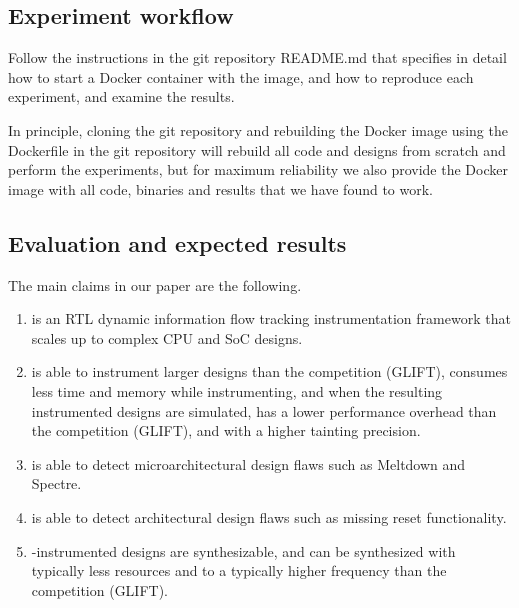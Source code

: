 \documentclass[letterpaper,twocolumn,10pt]{article}
\begin{document}
{%
\subsection{Experiment workflow}

Follow the instructions in the git repository README.md that specifies
in detail how to start a Docker container with the image, and how to
reproduce each experiment, and examine the results.

In principle, cloning the git repository and rebuilding the Docker image
using the Dockerfile in the git repository will rebuild all \ourname code
and designs from scratch and perform the experiments, but for maximum
reliability we also provide the Docker image with all code, binaries
and results that we have found to work.

\subsection{Evaluation and expected results}


The main claims in our paper are the following.

\begin{enumerate}
    \item \ourname is an RTL dynamic information flow tracking instrumentation framework that scales up to complex CPU and SoC designs.
    \item \ourname is able to instrument larger designs than the competition (GLIFT), consumes less time and memory while instrumenting, and when the resulting instrumented designs are simulated, has a lower performance overhead than the competition (GLIFT), and with a higher tainting precision.
    \item \ourname is able to detect microarchitectural design flaws such as Meltdown and Spectre.
    \item \ourname is able to detect architectural design flaws such as missing reset functionality.
    \item \ourname-instrumented designs are synthesizable, and can be synthesized with typically less resources and to a typically higher frequency than the competition (GLIFT).
\end{enumerate}

}
\end{document}
